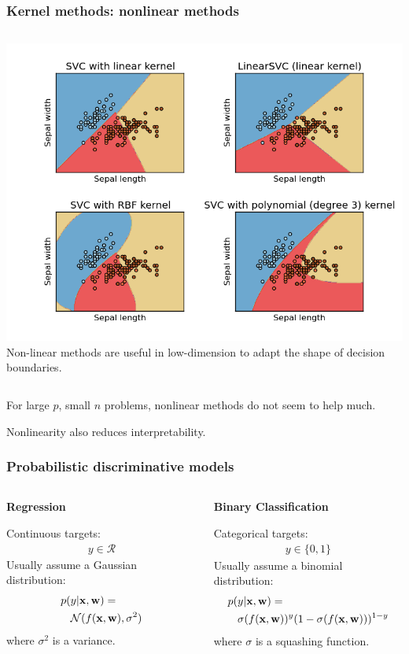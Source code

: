 \begin{frame}
\frametitle{Kernel methods: nonlinear methods}
\begin{columns}[cc]
\includegraphics[width=\textwidth]{sklearn_material/plot_iris_0012.png}
 Non-linear methods are useful in low-dimension
to adapt the shape of decision boundaries.
\end{columns}
For large $p$, small $n$ problems, nonlinear methods do not seem to help much.\par
Nonlinearity also reduces interpretability.
\end{frame}

\begin{frame}
\frametitle{Probabilistic discriminative models}
\begin{columns}[c]
\begin{block}
{\bf Regression}\par
Continuous targets:
\begin{align*}
y \in \mathcal{R}
\end{align*}
Usually assume a Gaussian distribution:
\begin{align*}
p(&y|{\bf x},{\bf w}) =\\
& \mathcal{N}(f({\bf x},{\bf w}),\sigma^2)
\end{align*}
where $\sigma^2$ is a variance.\par
\end{block}
\begin{block}
{\bf Binary Classification}\par
Categorical targets:
\begin{align*}
y \in \{0,1\}
\end{align*}
Usually assume a binomial distribution:
\begin{align*}
p(&y|{\bf x},{\bf w}) =\\
& \sigma(f({\bf x},{\bf w}))^{y} (1 - \sigma(f({\bf x},{\bf w})))^{1-y}
\end{align*}
where $\sigma$ is a squashing function.\par
\end{block}
\end{columns}
\end{frame}

